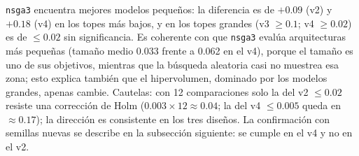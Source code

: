 \documentclass[11pt,a4paper]{article}
\begin{document}
\texttt{nsga3} encuentra mejores modelos pequeños: la diferencia es de $+0.09$ (v2) y $+0.18$ (v4) en los topes más bajos, y en los topes grandes (v3 $\ge 0.1$; v4 $\ge 0.02$) es de $\le 0.02$ sin significancia. Es coherente con que \texttt{nsga3} evalúa arquitecturas más pequeñas (tamaño medio 0.033 frente a 0.062 en el v4), porque el tamaño es uno de sus objetivos, mientras que la búsqueda aleatoria casi no muestrea esa zona; esto explica también que el hipervolumen, dominado por los modelos grandes, apenas cambie. Cautelas: con 12 comparaciones solo la del v2 $\le 0.02$ resiste una corrección de Holm ($0.003\times12\approx0.04$; la del v4 $\le 0.005$ queda en $\approx0.17$); la dirección es consistente en los tres diseños. La confirmación con semillas nuevas se describe en la subsección siguiente: se cumple en el v4 y no en el v2.
\end{document}
